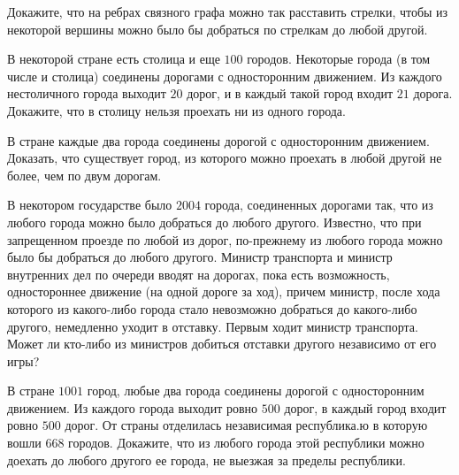 \begin{exersize}
	Докажите, что на ребрах связного графа можно так расставить стрелки, чтобы из некоторой вершины можно было бы добраться по стрелкам до любой другой.
\end{exersize}

\begin{exersize}
	В некоторой стране есть столица и еще $100$ городов. Некоторые города (в том числе и столица) соединены дорогами с односторонним движением. Из каждого нестоличного города выходит $20$ дорог, и в каждый такой город входит $21$ дорога. Докажите, что в столицу нельзя проехать ни из одного города.	
\end{exersize}

\begin{exersize}
	В стране каждые два города соединены дорогой с односторонним движением. Доказать, что существует город, из которого можно проехать в любой другой не более, чем по двум дорогам.
\end{exersize}

\begin{exersize}
	В некотором государстве было $2004$ города, соединенных дорогами так, что из любого города можно было добраться до любого другого. Известно, что при запрещенном проезде по любой из дорог, по-прежнему из любого города можно было бы добраться до любого другого. Министр транспорта и министр внутренних дел по очереди вводят на дорогах, пока есть возможность, одностороннее движение (на одной дороге за ход), причем министр, после хода которого из какого-либо города стало невозможно добраться до какого-либо другого, немедленно уходит в отставку. Первым ходит министр транспорта. Может ли кто-либо из министров добиться отставки другого независимо от его игры?
\end{exersize}	

\begin{exersize}
	В стране $1001$ город, любые два города соединены дорогой с односторонним движением. Из каждого города выходит ровно $500$ дорог, в каждый город входит ровно $500$ дорог. От страны отделилась независимая республика.ю в которую вошли $668$ городов. Докажите, что из любого города этой республики можно доехать до любого другого ее города, не выезжая за пределы республики.
\end{exersize}	 

